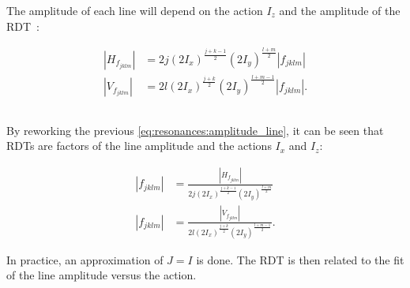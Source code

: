 The amplitude of each line will depend on the action $I_z$ and the amplitude of the
RDT~\cite{bartolini_normal_1997}:

\begin{equation}
    \begin{aligned}
    |H_{f_{jklm}}| &= 2 j (2 I_x)^\frac{j+k-1}{2} (2 I_y)^\frac{l+m}{2} |f_{jklm}| \\
    |V_{f_{jklm}}| &= 2 l (2 I_x)^\frac{j+k}{2} (2 I_y)^\frac{l+m-1}{2} |f_{jklm}|.
    \end{aligned}
    \label{eq:resonances:amplitude_line}
\end{equation}


\subsection{}

By reworking the previous \cref{eq:resonances:amplitude_line}, it can be seen that RDTs are factors
of the line amplitude and the actions $I_x$ and $I_z$:

\begin{equation}
    \begin{aligned}
    |f_{jklm}| &= \frac{|H_{f_{jklm}}|}{2 j (2 I_x)^\frac{j+k-1}{2} (2 I_y)^\frac{l+m}{2}} \\
    |f_{jklm}| &= \frac{|V_{f_{jklm}}|}{2 l (2 I_x)^\frac{j+k}{2} (2 I_y)^\frac{l+m-1}{2}} .
    \label{eq:resonances:amplitude_rdt}
    \end{aligned}
\end{equation}

In practice, an approximation of $J = I$ is done. The RDT is then related to the fit of the line
amplitude versus the action.%

